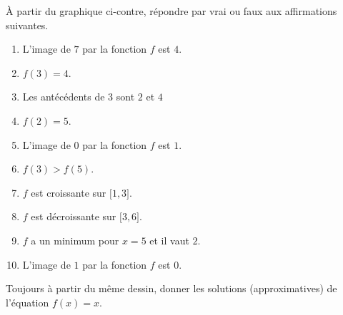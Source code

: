
\begin{exercice}\label{exoSeconde-0069}

    \begin{multicols}{2}

À partir du graphique ci-contre, répondre par vrai ou faux aux affirmations suivantes.

\begin{enumerate}
   \item
       L'image de \( 7\) par la fonction \( f\) est \( 4\).
   \item
       \( f(3)=4\).
   \item
       Les antécédents de \( 3\) sont \( 2\) et \( 4\)
   \item
       \( f(2)=5\).
   \item
       L'image de \( 0\) par la fonction \( f\) est \( 1\).
   \item
       \( f(3)>f(5)\).
   \item
       \( f\) est croissante sur \( \mathopen[ 1 , 3 \mathclose]\).
   \item
       \( f\) est décroissante sur \( \mathopen[ 3 , 6 \mathclose]\).
    \item
        \( f\) a un minimum pour \( x=5\) et il vaut \( 2\).
    \item
       L'image de \( 1\) par la fonction \( f\) est \( 0\).
\end{enumerate}

\columnbreak




    \end{multicols}

Toujours à partir du même dessin, donner les solutions (approximatives) de l'équation \( f(x)=x\).


\end{exercice}
